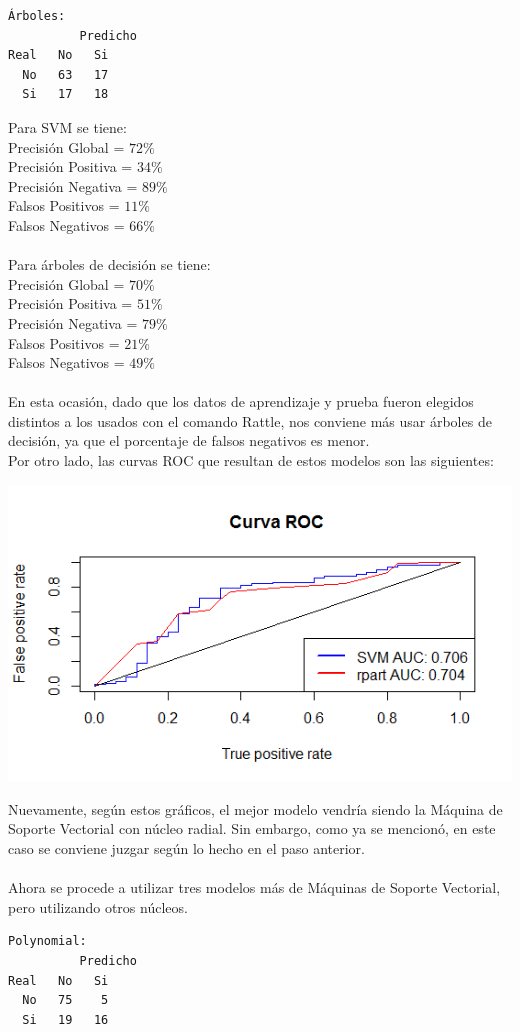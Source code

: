 \documentclass[11pt,a4paper]{report}
\begin{document}
\begin{itemize}
\begin{verbatim}
Árboles:
	      Predicho
Real   No 	Si
  No   63 	17
  Si   17 	18  
\end{verbatim}
Para SVM se tiene:\\
Precisión Global = $72\%$\\
Precisión Positiva = $34\%$\\
Precisión Negativa = $89\%$\\
Falsos Positivos = $11\%$\\
Falsos Negativos = $66\%$\\
\\
Para árboles de decisión se tiene:\\
Precisión Global = $70\%$\\
Precisión Positiva = $51\%$\\
Precisión Negativa = $79\%$\\
Falsos Positivos = $21\%$\\
Falsos Negativos = $49\%$\\
\\
En esta ocasión, dado que los datos de aprendizaje y prueba fueron elegidos distintos a los usados con el comando Rattle, nos conviene más usar árboles de decisión, ya que el porcentaje de falsos negativos es menor.\\
Por otro lado, las curvas ROC que resultan de estos modelos son las siguientes:
\begin{center}
\includegraphics[scale=0.8]{4-1b.png}\\
\end{center}
Nuevamente, según estos gráficos, el mejor modelo vendría siendo la Máquina de Soporte Vectorial con núcleo radial. Sin embargo, como ya se mencionó, en este caso se conviene juzgar según lo hecho en el paso anterior.\\
\\
Ahora se procede a utilizar tres modelos más de Máquinas de Soporte Vectorial, pero utilizando otros núcleos. 
\begin{verbatim}  
Polynomial:
	      Predicho
Real   No 	Si
  No   75 	 5
  Si   19 	16
  

\end{verbatim}
\end{itemize}
\end{document}
